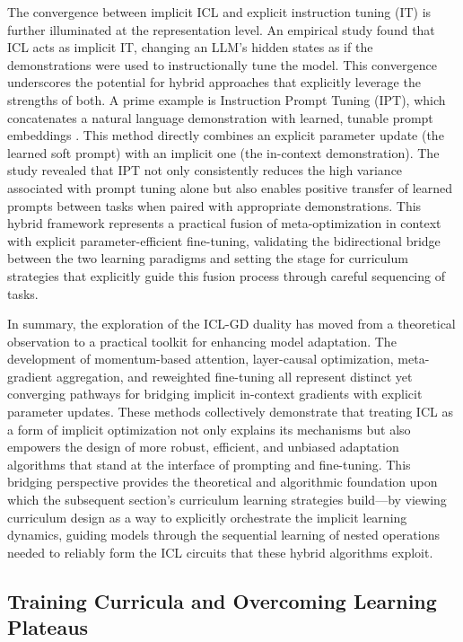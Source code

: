 \documentclass[11pt]{article}
\begin{document}
The convergence between implicit ICL and explicit instruction tuning (IT) is further illuminated at the representation level. An empirical study \cite{ref9} found that ICL acts as implicit IT, changing an LLM's hidden states as if the demonstrations were used to instructionally tune the model. This convergence underscores the potential for hybrid approaches that explicitly leverage the strengths of both. A prime example is Instruction Prompt Tuning (IPT), which concatenates a natural language demonstration with learned, tunable prompt embeddings \cite{ref31}. This method directly combines an explicit parameter update (the learned soft prompt) with an implicit one (the in-context demonstration). The study revealed that IPT not only consistently reduces the high variance associated with prompt tuning alone but also enables positive transfer of learned prompts between tasks when paired with appropriate demonstrations. This hybrid framework represents a practical fusion of meta-optimization in context with explicit parameter-efficient fine-tuning, validating the bidirectional bridge between the two learning paradigms and setting the stage for curriculum strategies that explicitly guide this fusion process through careful sequencing of tasks.

In summary, the exploration of the ICL-GD duality has moved from a theoretical observation to a practical toolkit for enhancing model adaptation. The development of momentum-based attention, layer-causal optimization, meta-gradient aggregation, and reweighted fine-tuning all represent distinct yet converging pathways for bridging implicit in-context gradients with explicit parameter updates. These methods collectively demonstrate that treating ICL as a form of implicit optimization not only explains its mechanisms but also empowers the design of more robust, efficient, and unbiased adaptation algorithms that stand at the interface of prompting and fine-tuning. This bridging perspective provides the theoretical and algorithmic foundation upon which the subsequent section's curriculum learning strategies build---by viewing curriculum design as a way to explicitly orchestrate the implicit learning dynamics, guiding models through the sequential learning of nested operations needed to reliably form the ICL circuits that these hybrid algorithms exploit.

\subsection{Training Curricula and Overcoming Learning Plateaus}
\end{document}
